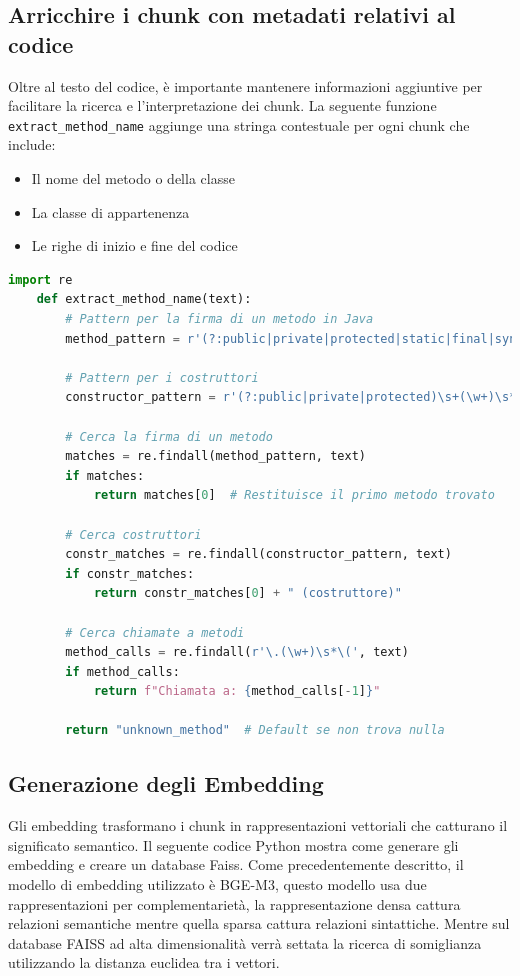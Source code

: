 \documentclass[12pt,a4paper,openright,twoside]{book}
\begin{document}
\subsection{Arricchire i chunk con metadati relativi al codice}
    Oltre al testo del codice, è importante mantenere informazioni aggiuntive per facilitare la ricerca e l'interpretazione dei chunk.
    La seguente funzione \texttt{extract\_method\_name} aggiunge una stringa contestuale per ogni chunk che include:
    \begin{itemize}
        \item Il nome del metodo o della classe
        \item La classe di appartenenza
        \item Le righe di inizio e fine del codice
    \end{itemize}

    \begin{lstlisting}[language=Python, caption={Funzione extract\_method\_name}]
    import re
    def extract_method_name(text):
        # Pattern per la firma di un metodo in Java
        method_pattern = r'(?:public|private|protected|static|final|synchronized|abstract|native)\s+[\w<>\[\]]+\s+(\w+)\s*\([^)]*\)'
        
        # Pattern per i costruttori
        constructor_pattern = r'(?:public|private|protected)\s+(\w+)\s*\([^)]*\)'
        
        # Cerca la firma di un metodo
        matches = re.findall(method_pattern, text)
        if matches:
            return matches[0]  # Restituisce il primo metodo trovato
        
        # Cerca costruttori
        constr_matches = re.findall(constructor_pattern, text)
        if constr_matches:
            return constr_matches[0] + " (costruttore)"
        
        # Cerca chiamate a metodi
        method_calls = re.findall(r'\.(\w+)\s*\(', text)
        if method_calls:
            return f"Chiamata a: {method_calls[-1]}"
        
        return "unknown_method"  # Default se non trova nulla
    \end{lstlisting}
        
\subsection{Generazione degli Embedding}
    Gli embedding trasformano i chunk in rappresentazioni vettoriali che catturano il significato semantico.
    Il seguente codice Python mostra come generare gli embedding e creare un database Faiss.
    Come precedentemente descritto, il modello di embedding utilizzato è BGE-M3, questo modello usa due rappresentazioni per complementarietà, la rappresentazione densa cattura relazioni semantiche mentre quella sparsa cattura relazioni sintattiche.
    Mentre sul database FAISS ad alta dimensionalità verrà settata la ricerca di somiglianza utilizzando la distanza euclidea tra i vettori.
    
\end{document}
